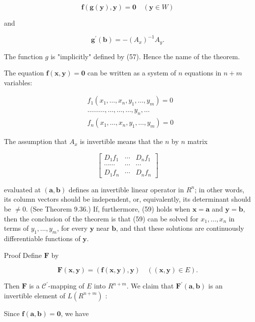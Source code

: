 \documentclass[10pt]{article}
\begin{document}
$$
\mathbf{f}(\mathbf{g}(\mathbf{y}), \mathbf{y})=\mathbf{0} \quad(\mathbf{y} \in W)
$$

and

$$
\mathbf{g}^{\prime}(\mathbf{b})=-\left(A_{x}\right)^{-1} A_{y} .
$$

The function $g$ is "implicitly" defined by (57). Hence the name of the theorem.

The equation $\mathbf{f}(\mathbf{x}, \mathbf{y})=\mathbf{0}$ can be written as a system of $n$ equations in $n+m$ variables:

$$
\begin{aligned}
& f_{1}\left(x_{1}, \ldots, x_{n}, y_{1}, \ldots, y_{m}\right)=0 \\
& \ldots \ldots \ldots, \ldots, \ldots, \ldots, y_{n}, \ldots \\
& f_{n}\left(x_{1}, \ldots, x_{n}, y_{1}, \ldots, y_{m}\right)=0
\end{aligned}
$$

The assumption that $A_{x}$ is invertible means that the $n$ by $n$ matrix

$$
\left[\begin{array}{ccc}
D_{1} f_{1} & \cdots & D_{n} f_{1} \\
\cdots \cdots & \cdots & \cdots \\
D_{1} f_{n} & \cdots & D_{n} f_{n}
\end{array}\right]
$$

evaluated at $(\mathbf{a}, \mathbf{b})$ defines an invertible linear operator in $R^{n}$; in other words, its column vectors should be independent, or, equivalently, its determinant should be $\neq 0$. (See Theorem 9.36.) If, furthermore, (59) holds when $\mathbf{x}=\mathbf{a}$ and $\mathbf{y}=\mathbf{b}$, then the conclusion of the theorem is that (59) can be solved for $x_{1}, \ldots, x_{n}$ in terms of $y_{1}, \ldots, y_{m}$, for every $\mathbf{y}$ near $\mathbf{b}$, and that these solutions are continuously differentiable functions of $\mathbf{y}$.

Proof Define $\mathbf{F}$ by

$$
\mathbf{F}(\mathbf{x}, \mathbf{y})=(\mathbf{f}(\mathbf{x}, \mathbf{y}), \mathbf{y}) \quad((\mathbf{x}, \mathbf{y}) \in E) .
$$

Then $\mathbf{F}$ is a $\mathscr{C}^{\prime}$-mapping of $E$ into $R^{n+m}$. We claim that $\mathbf{F}^{\prime}(\mathbf{a}, \mathbf{b})$ is an invertible element of $L\left(R^{n+m}\right)$ :

Since $\mathbf{f}(\mathbf{a}, \mathbf{b})=\mathbf{0}$, we have
\end{document}
